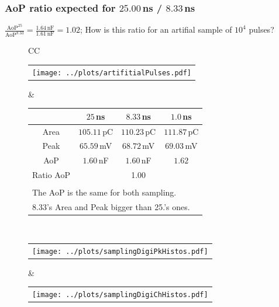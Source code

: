 \documentclass[aspectratio=169]{beamer}
\begin{document}
\begin{frame}
  \frametitle{AoP ratio expected for $25.00$\,ns / $8.33$\,ns}
  $ \frac{ \mathrm{AoP}^{25} } {\mathrm{AoP}^{8.33}}
  = \frac{1.64\,\mathrm{nF}}{1.61\,\mathrm{nF}} = 1.02$;
  How is this ratio for an artifial sample of $10^4$ pulses?

  \begin{figure}
    \centering
    \begin{tabularx}{\textwidth}{CC}
      \begin{tabular}{l}
        \texttt{[image: ../plots/artifitialPulses.pdf]}
      \end{tabular}
      &
      \footnotesize
      \begin{tabular}{c|c|c|c}
        {} & $25$\,ns & $8.33$\,ns & $1.0$\,ns \\ \hline
        Area & $105.11$\,pC & $110.23$\,pC & $111.87$\,pC \\
        Peak & $65.59$\,mV & $68.72$\,mV & $69.03$\,mV \\
        AoP & $1.60$\,nF & $1.60$\,nF & $ 1.62$ \\ \hline
        Ratio AoP & \multicolumn{3}{c}{1.00} \\
        \multicolumn{4}{l}{} \\
        \multicolumn{4}{l}{The AoP is the same for both sampling.} \\
        \multicolumn{4}{l}{8.33's Area and Peak bigger than 25.'s ones.}
      \end{tabular}
      \\
      \begin{tabular}{l}
        \texttt{[image: ../plots/samplingDigiPkHistos.pdf]}
      \end{tabular}
      &
      \begin{tabular}{l}
        \texttt{[image: ../plots/samplingDigiChHistos.pdf]}
      \end{tabular}
    \end{tabularx}
  \end{figure}
\end{frame}
\end{document}
